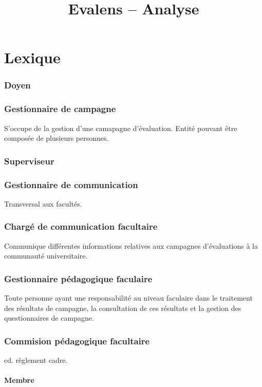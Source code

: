 \documentclass[a4paper,11pt]{report}
\title{Evalens -- Analyse}
\date{}
\begin{document}
\maketitle
\tableofcontents

\chapter{Lexique}

\subsection{Doyen}

\subsection{Gestionnaire de campagne}
S'occupe de la gestion d'une camapagne d'évaluation.
Entité pouvant être composée de plusieurs personnes.

\subsection{Superviseur}

\subsection{Gestionnaire de communication}
Transversal aux facultés.

\subsection{Chargé de communication facultaire}
Communique différentes informations relatives aux campagnes d'évaluations à la communauté universitaire.

\subsection{Gestionnaire pédagogique faculaire}
Toute personne ayant une responsabilité au niveau faculaire dans le traitement des résultats de campagne, la consultation de ces résultats et la gestion des questionnaires de campagne.

\subsection{Commision pédagogique facultaire}
cd. règlement cadre.
\subsubsection{Membre}
\end{document}
